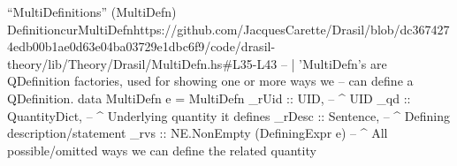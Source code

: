 \begin{haskell}{``MultiDefinitions'' (MultiDefn) Definition}{curMultiDefn}{}{https://github.com/JacquesCarette/Drasil/blob/dc3674274edb00b1ae0d63e04ba03729e1dbc6f9/code/drasil-theory/lib/Theory/Drasil/MultiDefn.hs\#L35-L43}
-- | 'MultiDefn's are QDefinition factories, used for showing one or more ways we
--   can define a QDefinition.
data MultiDefn e = MultiDefn {
    _rUid  :: UID,                         -- ^ UID
    _qd    :: QuantityDict,                -- ^ Underlying quantity it defines
    _rDesc :: Sentence,                    -- ^ Defining description/statement
    _rvs   :: NE.NonEmpty (DefiningExpr e) -- ^ All possible/omitted ways we can define the related quantity
}
\end{haskell}

